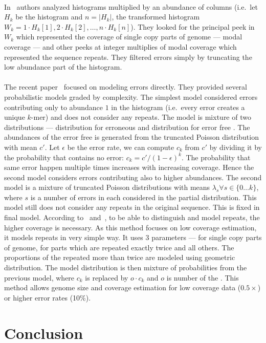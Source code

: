 \paragraph{} In~\cite{williams} authors analyzed \kmer histograms multiplied by an abundance of columns (i.e.\ let $H_k$ be the histogram and $n = |H_k|$, the transformed histogram $W_k = 1 \cdot H_k[1], 2\cdot H_k[2], \dots, n \cdot H_k[n]$). They looked for the principal peek in $W_k$ which represented the coverage of single copy parts of genome --- modal coverage --- and other peeks at integer multiplies of modal coverage which represented the sequence repeats.
They filtered errors simply by truncating the low abundance part of the histogram.

\paragraph{} The recent paper~\cite{covest} focused on modeling errors directly. They provided several probabilistic models graded by complexity.
The simplest model considered errors contributing only to abundance $1$ in the histogram (i.e.\ every error creates a unique $k$-mer) and does not consider any repeats. The model is mixture of two distributions --- distribution for erroneous \kmers and distribution for error free \kmers. The abundances of the error free \kmers is generated from the truncated Poisson distribution with mean $c'$. Let $\epsilon$ be the error rate, we can compute $c_k$ from $c'$ by dividing it by the probability that \kmer contains no error: $c_k = c'/{(1-\epsilon)}^k$. The probability that same error happen multiple times increases with increasing coverage. Hence the second model considers errors contributing also to higher abundances.
The second model is a mixture of truncated Poisson distributions with means $\lambda_s \forall s \in \{0\dots k\}$, where $s$ is a number of errors in each \kmer considered in the partial distribution. This model still does not consider any repeats in the original sequence.
This is fixed in final model. According to~\cite{waterman} and~\cite{williams}, to be able to distinguish and model repeats, the higher coverage is necessary. As this method focuses on low coverage estimation, it models repeats in very simple way. It uses 3 parameters --- for single copy parts of genome, for parts which are repeated exactly twice and all others. The proportions of the \kmers repeated more than twice are modeled using geometric distribution. The model distribution is then mixture of probabilities from the previous model, where $c_k$ is replaced by $o \cdot c_k$ and $o$ is number of the \kmer.
This method allows genome size and coverage estimation for low coverage data ($0.5\times$) or higher error rates (10\%).

\section{Conclusion}
